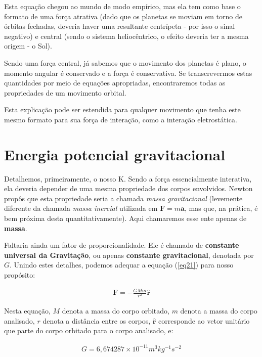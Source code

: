 Esta equação chegou ao mundo de modo empírico, mas ela tem como base o formato de uma força atrativa (dado que os planetas se moviam em torno de órbitas fechadas, deveria haver uma resultante centrípeta - por isso o sinal negativo) e central (sendo o sistema heliocêntrico, o efeito deveria ter a mesma origem - o Sol). {\\}

Sendo uma força central, já sabemos que o movimento dos planetas é plano, o momento angular é conservado e a força é conservativa. Se transcrevermos estas quantidades por meio de equações apropriadas, encontraremos todas as propriedades de um movimento orbital. {\\}

Esta explicação pode ser estendida para qualquer movimento que tenha este mesmo formato para sua força de interação, como a interação eletrostática.

\section{Energia potencial gravitacional}

Detalhemos, primeiramente, o nosso K. Sendo a força essencialmente interativa, ela deveria depender de uma mesma propriedade dos corpos envolvidos. Newton propôs que esta propriedade seria a chamada \textit{massa gravitacional} (levemente diferente da chamada \textit{massa inercial} utilizada em $\mathbf{F} = m\mathbf{a}$, mas que, na prática, é bem próxima desta quantitativamente). Aqui chamaremos esse ente apenas de \textbf{massa}. {\\}

Faltaria ainda um fator de proporcionalidade. Ele é chamado de \textbf{constante universal da Gravitação}, ou apenas \textbf{constante gravitacional}, denotada por $G$. Unindo estes detalhes, podemos adequar a equação (\ref{eq21}) para nosso propósito:

\begin{eqnarray}
    \mathbf{F} = -\frac{GMm}{r^2}\mathbf{\hat{r}}    \label{eq22}
\end{eqnarray}

Nesta equação, $M$ denota a massa do corpo orbitado, $m$ denota a massa do corpo analisado, $r$ denota a distância entre os corpos, $\mathbf{\hat{r}}$ corresponde ao vetor unitário que parte do corpo orbitado para o corpo analisado, e:

\begin{eqnarray}
    G =  6,674287 \times 10^{-11}  m^3kg^{-1}s^{-2}   \label{eq23}
\end{eqnarray}

